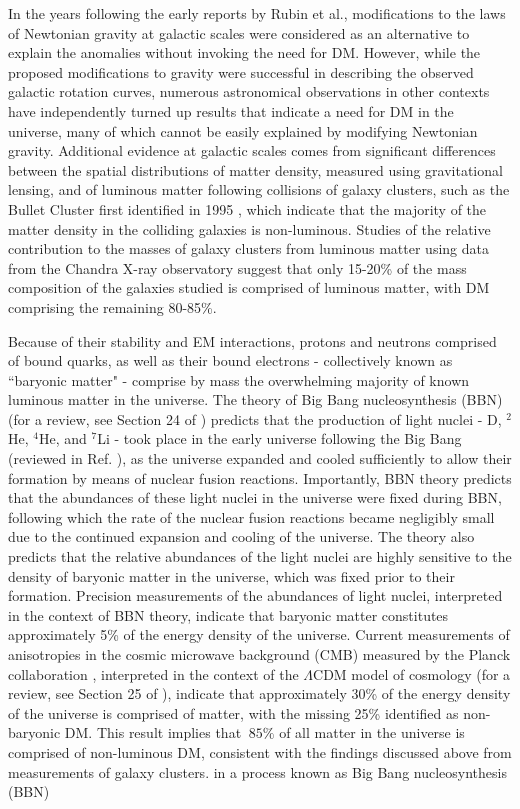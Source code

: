 In the years following the early reports by Rubin et al., modifications to the laws of Newtonian gravity at galactic scales \cite{mond_1983} were considered as an alternative to explain the anomalies without invoking the need for DM. However, while the proposed modifications to gravity were successful in describing the observed galactic rotation curves, numerous astronomical observations in other contexts have independently turned up results that indicate a need for DM in the universe, many of which cannot be easily explained by modifying Newtonian gravity. Additional evidence at galactic scales comes from significant differences between the spatial distributions of matter density, measured using gravitational lensing, and of luminous matter following collisions of galaxy clusters, such as the Bullet Cluster first identified in 1995 \cite{bullet_1995}, which indicate that the majority of the matter density in the colliding galaxies is non-luminous. Studies of the relative contribution to the masses of galaxy clusters from luminous matter using data from the Chandra X-ray observatory \cite{Chandra_2013} suggest that only 15-20\% of the mass composition of the galaxies studied is comprised of luminous matter, with DM comprising the remaining 80-85\%.
 
Because of their stability and EM interactions, protons and neutrons comprised of bound quarks, as well as their bound electrons - collectively known as ``baryonic matter" - comprise by mass the overwhelming majority of known luminous matter in the universe. The theory of Big Bang nucleosynthesis (BBN) (for a review, see Section 24 of \cite{pdg_2020}) predicts that the production of light nuclei - D, \(^2\)He, \(^4\)He, and \(^7\)Li - took place in the early universe following the Big Bang (reviewed in Ref.  \cite{uzan2016bigbang}), as the universe expanded and cooled sufficiently to allow their formation by means of nuclear fusion reactions. Importantly, BBN theory predicts that the abundances of these light nuclei in the universe were fixed during BBN, following which the rate of the nuclear fusion reactions became negligibly small due to the continued expansion and cooling of the universe. The theory also predicts that the relative abundances of the light nuclei are highly sensitive to the density of baryonic matter in the universe, which was fixed prior to their formation. Precision measurements of the abundances of light nuclei, interpreted in the context of BBN theory, indicate that baryonic matter constitutes approximately 5\% \cite{pdg_2020} of the energy density of the universe. Current measurements of anisotropies in the cosmic microwave background (CMB) \cite{cmb_1965} measured by the Planck collaboration \cite{Planck_2020}, interpreted in the context of the \(\Lambda\)CDM model of cosmology (for a review, see Section 25 of \cite{pdg_2020}), indicate that approximately 30\% of the energy density of the universe is comprised of matter, with the missing 25\% identified as non-baryonic DM. This result implies that \(~85\%\) of all matter in the universe is comprised of non-luminous DM, consistent with the findings discussed above from measurements of galaxy clusters.
in a process known as Big Bang nucleosynthesis (BBN)

